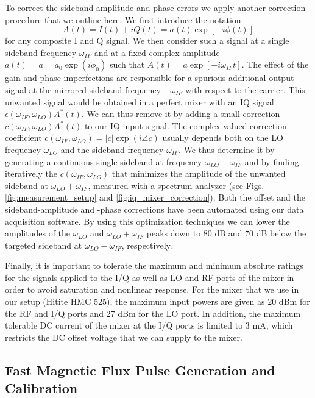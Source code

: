 To correct the sideband amplitude and phase errors we apply another correction procedure that we outline here. We first introduce the notation
\begin{equation}
A(t) = I(t)+iQ(t) = a(t)\exp{[-i \phi(t)]} \label{eq:iq_if_input}
\end{equation}
for any composite I and Q signal. We then consider such a signal at a single sideband frequency $\omega_{IF}$ and at a fixed complex amplitude $a(t)=a= a_0\exp{(i\phi_0)}$ such that $A(t) =a \exp{[-i \omega_{IF} t]} $. The effect of the gain and phase imperfections are responsible for a spurious additional output signal at the mirrored sideband frequency $-\omega_{IF}$ with respect to the carrier. This unwanted signal would be obtained in a perfect mixer with an IQ signal $\epsilon(\omega_{IF},\omega_{LO})A^*(t)$. We can thus remove it by adding a small correction $c(\omega_{IF},\omega_{LO})A^*(t)$ to our IQ input signal. The complex-valued correction coefficient $c(\omega_{IF},\omega_{LO})=|c|\exp{(i\angle c)}$ usually depends both on the LO frequency $\omega_{LO}$ and the sideband frequency $\omega_{IF}$. We thus determine it  by generating a continuous single sideband at frequency  $\omega_{LO}-\omega_{IF}$  and by finding  iteratively the  $c(\omega_{IF},\omega_{LO})$ that minimizes the amplitude of the unwanted sideband at $\omega_{LO}+\omega_{IF}$, measured with a spectrum analyzer (see Figs.  \ref{fig:measurement_setup} and \ref{fig:iq_mixer_correction}). Both the offset and the sideband-amplitude and -phase corrections have been automated using our data acquisition software. By using this optimization techniques we can lower the amplitudes of the $\omega_{LO}$  and $\omega_{LO}+\omega_{IF}$ peaks down to 80 dB and 70 dB below the targeted sideband at $\omega_{LO}-\omega_{IF}$, respectively.

\smallskip

Finally, it is important to tolerate the maximum and minimum absolute ratings for the signals applied to the I/Q  as well as LO and RF ports of the mixer in order to avoid saturation and nonlinear response. For the mixer that we use in our setup (Hitite HMC 525), the maximum input powers are given as 20 dBm for the RF and I/Q ports and 27 dBm for the LO port. In addition, the maximum tolerable DC current of the mixer at the I/Q ports is limited to 3 mA, which restricts the DC offset voltage that we can supply to the mixer.

\subsection{Fast Magnetic Flux Pulse Generation and Calibration}

